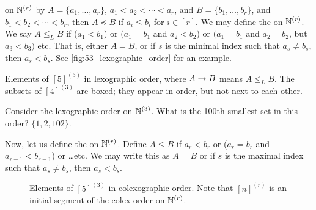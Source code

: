  on $\mathbb{N}^{(r)}$ by $A = \{a_1,\dotsc,a_r\}$, $a_1<a_2<\dotsb < a_r$, and $B=\{b_1,\dotsc,b_r\}$, and $b_1<b_2<\dotsb < b_r$, then $A\preceq B$ if $a_i\leq b_i$ for $i\in[r]$.
We may define the  on $\mathbb{N}^{(r)}$. We say $A\leq_L B$ if ($a_1<b_1$) or ($a_1=b_1$ and $a_2 < b_2$) or $(a_1 = b_1$ and $a_2=b_2$, but $a_3<b_3)$ etc. That is, either $A=B$, or if $s$ is the minimal index such that $a_s\neq b_s$, then $a_s<b_s$. See \cref{fig:53_lexographic_order} for an example.
\begin{marginfigure}

\caption{Elements of $[5]^{(3)}$ in lexographic order, where $A\rightarrow B$ means $A\leq_L B$. The subsets of $[4]^{(3)}$ are boxed; they appear in order, but not next to each other.} \label{fig:53_lexographic_order}
\end{marginfigure}

Consider the lexographic order on $\mathbb{N}^{(3)}$. What is the 100th smallest set in this order? $\{1,2,102\}$.


Now, let us define the  on $\mathbb{N}^{(r)}$. Define $A\leq B$ if $a_r<b_r$ or ($a_r=b_r$ and $a_{r-1} <b_{r-1}$) or \ldots etc. We may write this as $A=B$ or if $s$ is the maximal index such that $a_s\neq b_s$, then $a_s<b_s$. 




\begin{figure*}[ht]
\centering

\bigskip
\caption{Elements of $[5]^{(3)}$ in colexographic order. Note that $[n]^{(r)}$ is an initial segment of the colex order on $\mathbb{N}^{(r)}$. \label{fig:53_colexographic_order}} 
\end{figure*}

